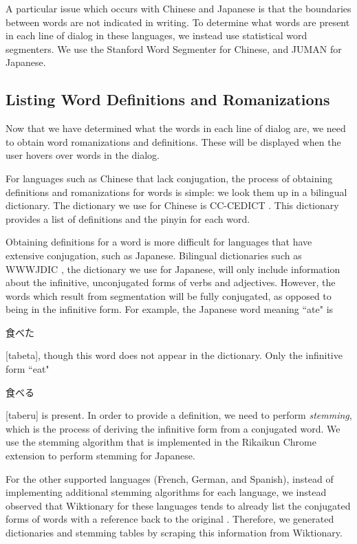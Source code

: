 \documentclass{sigchi}
\begin{document}
A particular issue which occurs with Chinese and Japanese is that the boundaries between
words are not indicated in writing. To determine what words are present
in each line of dialog in these languages, we instead use statistical word segmenters. We use the Stanford Word Segmenter \cite{stanfordsegmenter} for Chinese, and JUMAN \cite{juman} for Japanese.

\subsection{Listing Word Definitions and Romanizations}

Now that we have determined what the words in each line of dialog are, we need
to obtain word romanizations and definitions. These will be displayed when
the user hovers over words in the dialog.

For languages such as Chinese that lack conjugation, the process of obtaining definitions and romanizations for words is simple: we look them up in a bilingual dictionary. The dictionary we use for Chinese is CC-CEDICT \cite{mdbg}. This dictionary provides a list of definitions and the pinyin for each word.

Obtaining definitions for a word is more difficult for languages that have extensive conjugation, such as Japanese. Bilingual dictionaries such as WWWJDIC \cite{wwwjdic}, the dictionary we use for Japanese, will only include information about the infinitive, unconjugated forms of verbs and adjectives. However, the words which result from segmentation will be fully conjugated, as opposed to being in the infinitive form. For example, the Japanese word meaning ``ate" is \begin{CJK}{UTF8}{min}食べた\end{CJK} [tabeta], though this word does not appear in the dictionary. Only the infinitive form ``eat" \begin{CJK}{UTF8}{min}食べる\end{CJK} [taberu] is present. In order to provide a definition, we need to perform \emph{stemming}, which is the process of deriving the infinitive form from a conjugated word. We use the stemming algorithm that is implemented in the Rikaikun Chrome extension \cite{rikaikun} to perform stemming for Japanese.

For the other supported languages (French, German, and Spanish), instead of implementing additional stemming algorithms for each language, we instead observed that Wiktionary for these languages tends to already list the conjugated forms of words with a reference back to the original \cite{wiktionary}. Therefore, we generated dictionaries and stemming tables by scraping this information from Wiktionary.
\end{document}
